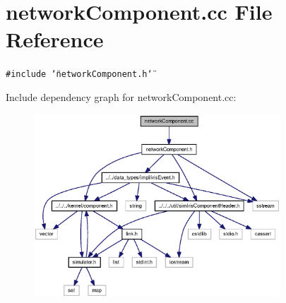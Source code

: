 \section{networkComponent.cc File Reference}
\label{networkComponent_8cc}
{\tt \#include \char`\"{}networkComponent.h\char`\"{}}\par


Include dependency graph for networkComponent.cc:\nopagebreak
\begin{figure}[H]
\begin{center}
\leavevmode
\includegraphics[width=262pt]{networkComponent_8cc__incl}
\end{center}
\end{figure}
